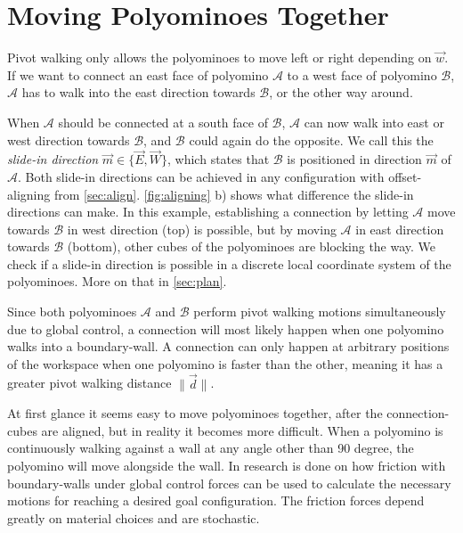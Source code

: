 \section{Moving Polyominoes Together}
\label{sec:walk_wait}

Pivot walking only allows the polyominoes to move left or right depending on $\vec{w}$.
If we want to connect an east face of polyomino $\mathcal{A}$ to a west face of polyomino $\mathcal{B}$, $\mathcal{A}$ has to walk into the east direction towards $\mathcal{B}$, or the other way around.

When $\mathcal{A}$ should be connected at a south face of $\mathcal{B}$, $\mathcal{A}$ can now walk into east or west direction towards $\mathcal{B}$, and $\mathcal{B}$ could again do the opposite.
We call this the \textit{slide-in direction} $\vec{m} \in \{\vec{E}, \vec{W}\}$, which states that $\mathcal{B}$ is positioned in direction $\vec{m}$ of $\mathcal{A}$.
Both slide-in directions can be achieved in any configuration with offset-aligning from \autoref{sec:align}.
\autoref{fig:aligning} b) shows what difference the slide-in directions can make.
In this example, establishing a connection by letting $\mathcal{A}$ move towards $\mathcal{B}$ in west direction (top) is possible, but by moving $\mathcal{A}$ in east direction towards $\mathcal{B}$ (bottom), other cubes of the polyominoes are blocking the way.
We check if a slide-in direction is possible in a discrete local coordinate system of the polyominoes.
More on that in \autoref{sec:plan}.

Since both polyominoes $\mathcal{A}$ and $\mathcal{B}$ perform pivot walking motions simultaneously due to global control, a connection will most likely happen when one polyomino walks into a boundary-wall.
A connection can only happen at arbitrary positions of the workspace when one polyomino is faster than the other, meaning it has a greater pivot walking distance $\lVert \vec{d} \rVert$.

At first glance it seems easy to move polyominoes together, after the connection-cubes are aligned, but in reality it becomes more difficult.
When a polyomino is continuously walking against a wall at any angle other than 90 degree, the polyomino will move alongside the wall.
In \cite{schmidt2020} research is done on how friction with boundary-walls under global control forces can be used to calculate the necessary motions for reaching a desired goal configuration.
The friction forces depend greatly on material choices and are stochastic.

